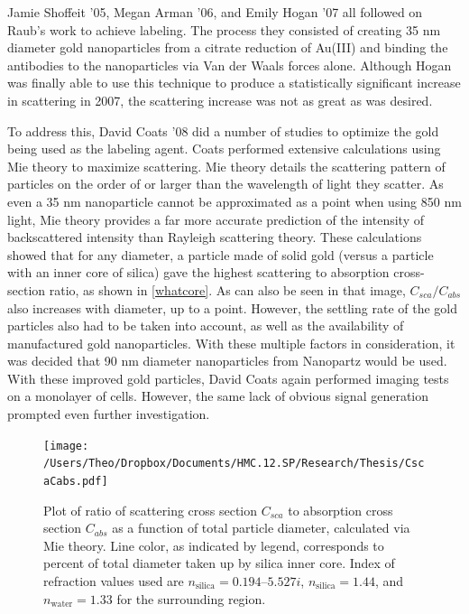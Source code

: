 Jamie Shoffeit '05, Megan Arman '06, and Emily Hogan '07 all followed on Raub's work to achieve labeling. The process they consisted of creating 35 nm diameter gold nanoparticles from a citrate reduction of Au(III) and binding the antibodies to the nanoparticles via Van der Waals forces alone. Although Hogan was finally able to use this technique to produce a statistically significant increase in scattering in 2007, the scattering increase was not as great as was desired.

To address this, David Coats '08 did a number of studies to optimize the gold being used as the labeling agent. Coats performed extensive calculations using Mie theory to maximize scattering. Mie theory details the scattering pattern of particles on the order of or larger than the wavelength of light they scatter. As even a 35 nm nanoparticle cannot be approximated as a point when using 850 nm light, Mie theory provides a far more accurate prediction of the intensity of backscattered intensity than Rayleigh scattering theory. These calculations showed that for any diameter, a particle made of solid gold (versus a particle with an inner core of silica) gave the highest scattering to absorption cross-section ratio, as shown in \autoref{whatcore}. As can also be seen in that image, $C_{sca}/C_{abs}$ also increases with diameter, up to a point. However, the settling rate of the gold particles also had to be taken into account, as well as the availability of manufactured gold nanoparticles. With these multiple factors in consideration, it was decided that 90 nm diameter nanoparticles from Nanopartz would be used. With these improved gold particles, David Coats again performed imaging tests on a monolayer of cells. However, the same lack of obvious signal generation prompted even further investigation.

\begin{figure}[htbp]
\centering
\texttt{[image: /Users/Theo/Dropbox/Documents/HMC.12.SP/Research/Thesis/CscaCabs.pdf]}
\caption{Plot of ratio of scattering cross section $C_{sca}$ to absorption cross section $C_{abs}$ as a function of total particle diameter, calculated via Mie theory. Line color, as indicated by legend, corresponds to percent of total diameter taken up by silica inner core. Index of refraction values used are $n_{\mathrm{silica}}=0.194 – 5.527i$, $n_{\mathrm{silica}}=1.44$, and $n_{\mathrm{water}}=1.33$ for the surrounding region.}
\label{whatcore}
\end{figure}



